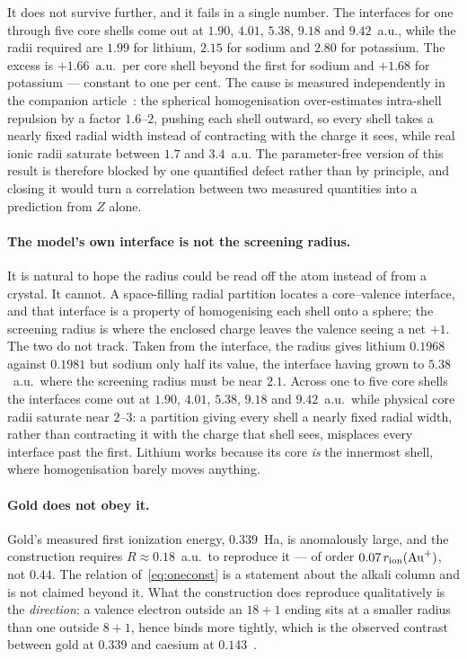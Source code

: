 \documentclass[11pt]{article}
\begin{document}
It does not survive further, and it fails in a single number. The interfaces for one through
five core shells come out at $1.90$, $4.01$, $5.38$, $9.18$ and $9.42$~a.u., while the radii
required are $1.99$ for lithium, $2.15$ for sodium and $2.80$ for potassium. The excess is
$+1.66$~a.u.\ per core shell beyond the first for sodium and $+1.68$ for potassium --- constant
to one per cent. The cause is measured independently in the companion
article~\cite{Johnson-atoms}: the spherical homogenisation over-estimates intra-shell repulsion
by a factor $1.6$--$2$, pushing each shell outward, so every shell takes a nearly fixed radial
width instead of contracting with the charge it sees, while real ionic radii saturate between
$1.7$ and $3.4$~a.u. The parameter-free version of this result is therefore blocked by one
quantified defect rather than by principle, and closing it would turn a correlation between two
measured quantities into a prediction from $Z$ alone.

\paragraph{The model's own interface is not the screening radius.} It is natural to hope the
radius could be read off the atom instead of from a crystal. It cannot. A space-filling
radial partition locates a core--valence interface, and that interface is a property of
homogenising each shell onto a sphere; the screening radius is where the enclosed charge
leaves the valence seeing a net $+1$. The two do not track. Taken from the interface, the
radius gives lithium $0.1968$ against $0.1981$ but sodium only half its value, the interface
having grown to $5.38$~a.u.\ where the screening radius must be near $2.1$. Across one to
five core shells the interfaces come out at $1.90$, $4.01$, $5.38$, $9.18$ and
$9.42$~a.u.\ while physical core radii saturate near $2$--$3$: a partition giving every shell
a nearly fixed radial width, rather than contracting it with the charge that shell sees,
misplaces every interface past the first. Lithium works because its core \emph{is} the
innermost shell, where homogenisation barely moves anything.

\paragraph{Gold does not obey it.} Gold's measured first ionization energy, $0.339$~Ha, is
anomalously large, and the construction requires $R\approx0.18$~a.u.\ to reproduce it --- of
order $0.07\,r_{\rm ion}(\mathrm{Au}^+)$, not $0.44$. The relation
of~\eqref{eq:oneconst} is a statement about the alkali column and is not claimed beyond it.
What the construction does reproduce qualitatively is the \emph{direction}: a valence electron
outside an $18{+}1$ ending sits at a smaller radius than one outside $8{+}1$, hence binds
more tightly, which is the observed contrast between gold at $0.339$ and caesium at
$0.143$~\cite{NIST}.
\end{document}
